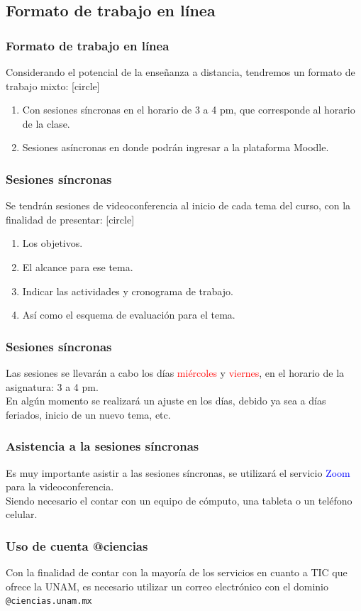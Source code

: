 \subsection{Formato de trabajo en línea}
\begin{frame}
\frametitle{Formato de trabajo en línea}
Considerando el potencial de la enseñanza a distancia, tendremos un formato de trabajo mixto:
[circle]
\begin{enumerate}[<+->]
\item Con sesiones síncronas en el horario de 3 a 4 pm, que corresponde al horario de la clase.
\item Sesiones asíncronas en donde podrán ingresar a la plataforma Moodle.
\end{enumerate}
\end{frame}
\begin{frame}
\frametitle{Sesiones síncronas}
Se tendrán sesiones de videoconferencia al inicio de cada tema del curso, con la finalidad de presentar:
[circle]
\begin{enumerate}[<+->]
\item Los objetivos.
\item El alcance para ese tema.
\item Indicar las actividades y cronograma de trabajo.
\item Así como el esquema de evaluación para el tema.
\end{enumerate}
\end{frame}
\begin{frame}
\frametitle{Sesiones síncronas}
Las sesiones se llevarán a cabo los días \textcolor{red}{miércoles} y \textcolor{red}{viernes}, en el horario de la asignatura: 3 a 4 pm.
\\
\bigskip
\pause
En algún momento se realizará un ajuste en los días, debido ya sea a días feriados, inicio de un nuevo tema, etc.
\end{frame}
\begin{frame}
\frametitle{Asistencia a la sesiones síncronas}
Es muy importante asistir a las sesiones síncronas, se utilizará el servicio \textcolor{blue}{Zoom} para la videoconferencia.
\\
\bigskip
\pause
Siendo necesario el contar con un equipo de cómputo, una tableta o un teléfono celular.
\end{frame}
\begin{frame}
\frametitle{Uso de cuenta @ciencias}
Con la finalidad de contar con la mayoría de los servicios en cuanto a TIC que ofrece la UNAM, es necesario utilizar un correo electrónico con el dominio \texttt{@ciencias.unam.mx}
\end{frame}
